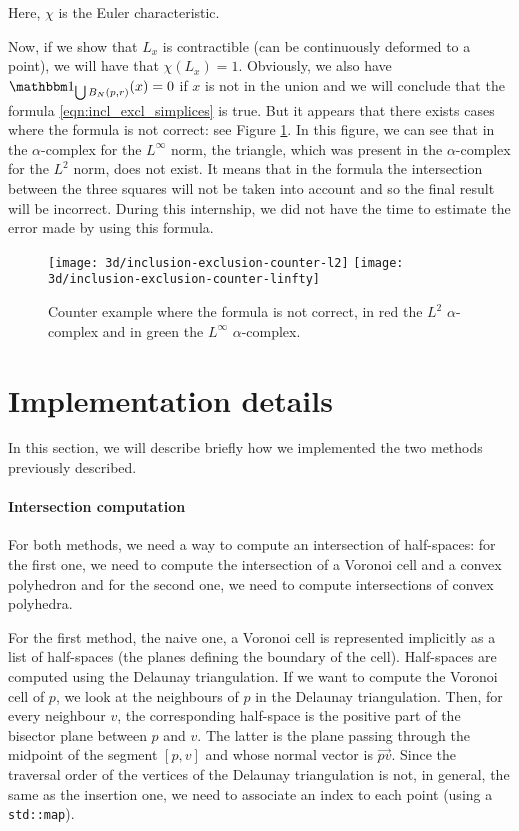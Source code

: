 Here, $ \chi $ is the Euler characteristic.

Now, if we show that $ L_x $ is contractible (can be continuously deformed to a
point), we will have that $ \chi(L_x) = 1 $. Obviously, we also have $
\indicator{\bigcup B_N(p, r)}(x) = 0 $ if $ x $ is not in the union and we will
conclude that the formula \ref{eqn:incl_excl_simplices} is true. But it appears
that there exists cases where the formula is not correct: see Figure
\ref{fig:incl_excl-examples}. In this figure, we can see that in the
$\alpha$-complex for the $ L^\infty $ norm, the triangle, which was present in
the $\alpha$-complex for the $ L^2 $ norm, does not exist. It means that in the
formula the intersection between the three squares will not be taken into
account and so the final result will be incorrect. During this internship, we
did not have the time to estimate the error made by using this formula.

\begin{figure}[h]
    \centering
    \texttt{[image: 3d/inclusion-exclusion-counter-l2]}
    \hspace{2cm}
    \texttt{[image: 3d/inclusion-exclusion-counter-linfty]}
    \caption{Counter example where the formula is not correct, in red the
        $ L^2$ $\alpha$-complex and in green the $ L^\infty$ $\alpha$-complex.}
    \label{fig:incl_excl-examples}
\end{figure}

\section{Implementation details}
\label{sec:3d-implementation}

In this section, we will describe briefly how we implemented the two methods
previously described.

\paragraph{Intersection computation}

For both methods, we need a way to compute an intersection of half-spaces: for
the first one, we need to compute the intersection of a Voronoi cell and a
convex polyhedron and for the second one, we need to compute intersections of
convex polyhedra.

For the first method, the naive one, a Voronoi cell is represented implicitly as
a list of half-spaces (the planes defining the boundary of the cell).
Half-spaces are computed using the Delaunay triangulation. If we want to compute
the Voronoi cell of $ p $, we look at the neighbours of $ p $ in the Delaunay
triangulation. Then, for every neighbour $ v $, the corresponding half-space is
the positive part of the bisector plane between $ p $ and $ v $. The latter is
the  plane passing through the midpoint of the segment $ [p, v] $ and whose
normal vector is $ \vec{pv} $. Since the traversal order of the vertices of the
Delaunay triangulation is not, in general, the same as the insertion one, we
need to associate an index to each point (using a \texttt{std::map}).

